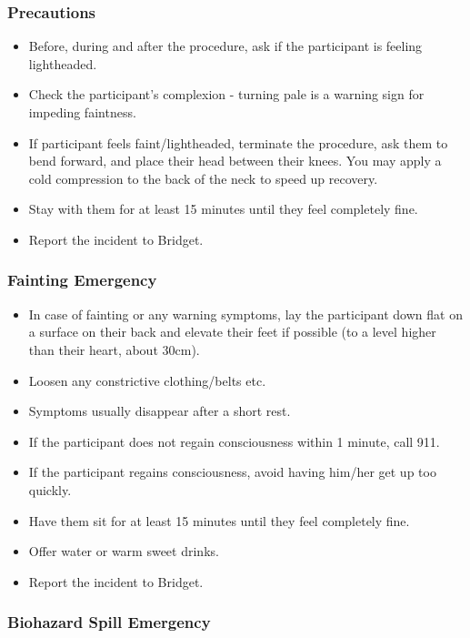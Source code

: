 \documentclass[
]{book}
\providecommand{\tightlist}{%
  \setlength{\itemsep}{0pt}\setlength{\parskip}{0pt}}
\begin{document}
\hypertarget{precautions}{%
\subsubsection{Precautions}\label{precautions}}

\begin{itemize}
\tightlist
\item
  Before, during and after the procedure, ask if the participant is feeling lightheaded.
\item
  Check the participant's complexion - turning pale is a warning sign for impeding faintness.
\item
  If participant feels faint/lightheaded, terminate the procedure, ask them to bend forward, and place their head between their knees. You may apply a cold compression to the back of the neck to speed up recovery.
\item
  Stay with them for at least 15 minutes until they feel completely fine.
\item
  Report the incident to Bridget.
\end{itemize}

\hypertarget{fainting-emergency}{%
\subsubsection{Fainting Emergency}\label{fainting-emergency}}

\begin{itemize}
\tightlist
\item
  In case of fainting or any warning symptoms, lay the participant down flat on a surface on their back and elevate their feet if possible (to a level higher than their heart, about 30cm).
\item
  Loosen any constrictive clothing/belts etc.
\item
  Symptoms usually disappear after a short rest.
\item
  If the participant does not regain consciousness within 1 minute, call 911.
\item
  If the participant regains consciousness, avoid having him/her get up too quickly.
\item
  Have them sit for at least 15 minutes until they feel completely fine.
\item
  Offer water or warm sweet drinks.
\item
  Report the incident to Bridget.
\end{itemize}

\hypertarget{biohazard-spill-emergency}{%
\subsubsection{Biohazard Spill Emergency}\label{biohazard-spill-emergency}}
\end{document}
